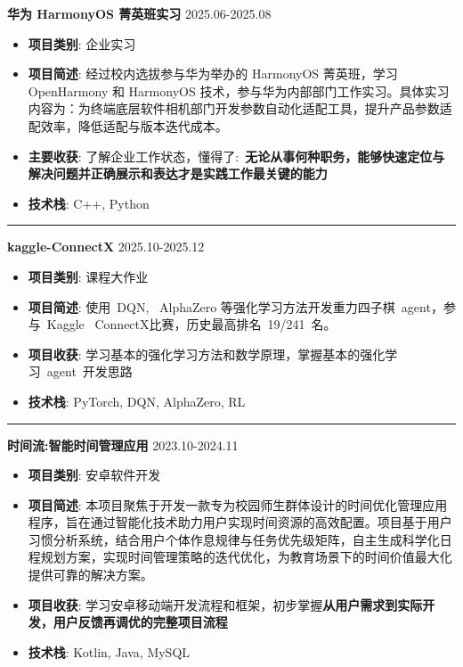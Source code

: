\documentclass[11pt]{article}
\begin{document}
\textbf{\large \color{CVBlue} 华为 HarmonyOS 菁英班实习} \hfill 2025.06-2025.08
\begin{itemize}
    \item \textbf{项目类别}: 企业实习
    
    \item \textbf{项目简述}: 经过校内选拔参与华为举办的 HarmonyOS 菁英班，学习 OpenHarmony 和 HarmonyOS 技术，参与华为内部部门工作实习。具体实习内容为：为终端底层软件相机部门开发参数自动化适配工具，提升产品参数适配效率，降低适配与版本迭代成本。
    \item[\textcolor{CVBlue}{\faStar}] \textbf{\textcolor{CVBlue}{主要收获}}: 了解企业工作状态，懂得了:\ \textbf{无论从事何种职务，能够快速定位与解决问题并正确展示和表达才是实践工作最关键的能力}
    \item \textbf{技术栈}: C++, Python
\end{itemize}

\par\noindent\textcolor{black!20}{\rule{\linewidth}{0.5pt}}

\vspace*{0.1em}

\textbf{\large \color{CVBlue} kaggle-ConnectX} \hfill 2025.10-2025.12
\begin{itemize}
    \item \textbf{项目类别}: 课程大作业
    
    \item \textbf{项目简述}: 使用\ DQN, \ AlphaZero 等强化学习方法开发重力四子棋\ agent，参与\ Kaggle \ ConnectX比赛，历史最高排名\ 19/241\ 名。
    \item[\textcolor{CVBlue}{\faStar}] \textbf{\textcolor{CVBlue}{项目收获}}: 学习基本的强化学习方法和数学原理，掌握基本的强化学习\ agent\ 开发思路
    \item \textbf{技术栈}: PyTorch, DQN, AlphaZero, RL
\end{itemize}

\par\noindent\textcolor{black!20}{\rule{\linewidth}{0.5pt}}

\vspace*{0.1em}

\textbf{\large \color{CVBlue} 时间流:智能时间管理应用} \hfill 2023.10-2024.11
\begin{itemize}
    \item \textbf{项目类别}: 安卓软件开发
    
    \item \textbf{项目简述}: 本项目聚焦于开发一款专为校园师生群体设计的时间优化管理应用程序，旨在通过智能化技术助力用户实现时间资源的高效配置。项目基于用户习惯分析系统，结合用户个体作息规律与任务优先级矩阵，自主生成科学化日程规划方案，实现时间管理策略的迭代优化，为教育场景下的时间价值最大化提供可靠的解决方案。
    \item[\textcolor{CVBlue}{\faStar}] \textbf{\textcolor{CVBlue}{项目收获}}: 学习安卓移动端开发流程和框架，初步掌握\textbf{从用户需求到实际开发，用户反馈再调优的完整项目流程}
    \item \textbf{技术栈}: Kotlin, Java, MySQL
\end{itemize}
\end{document}
